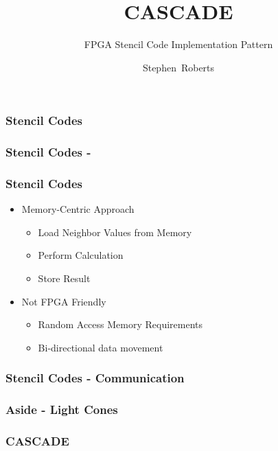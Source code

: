 \documentclass[draft]{beamer}
\title{CASCADE}
\subtitle{FPGA Stencil Code Implementation Pattern}
\author{Stephen~Roberts}
\institute{The University Of Warwick}
\begin{document}
  \frame{\titlepage}
  \begin{frame}
    \frametitle{Stencil Codes}
    \begin{figure}
      \centering
      
    \end{figure}
  \end{frame}

  \begin{frame}
    \frametitle{Stencil Codes - }
    \begin{figure}
      \centering
      
    \end{figure}
  \end{frame}

  \begin{frame}
    \frametitle{Stencil Codes}
    \begin{itemize}
      \item<1->{Memory-Centric Approach}
        \begin{itemize}
          \item{Load Neighbor Values from Memory}
          \item{Perform Calculation}
          \item{Store Result}
        \end{itemize}
      \item<2->{Not FPGA Friendly}
        \begin{itemize}
          \item{Random Access Memory Requirements}
          \item{Bi-directional data movement}
        \end{itemize}
    \end{itemize}
  \end{frame}

  \begin{frame}
    \frametitle{Stencil Codes - Communication}
    \begin{figure}
      \centering
      
    \end{figure}
  \end{frame}

  \begin{frame}
    \frametitle{Aside - Light Cones}
    \centering
    
  \end{frame}

  \begin{frame}
    \frametitle{CASCADE}
  \end{frame}
\end{document}
